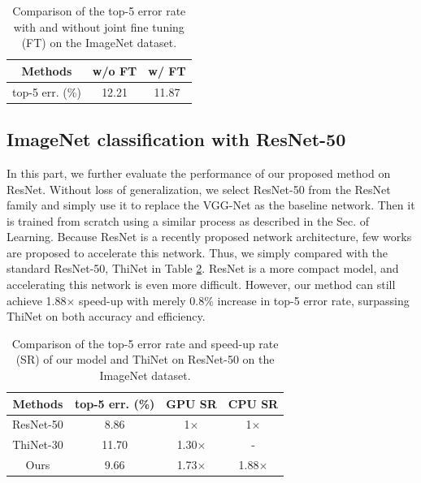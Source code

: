 \documentclass[letterpaper]{article} %
\begin{document}
\begin{table}[htbp]
\centering
\begin{tabular}{c|c|c}
\hline
\centering  Methods  & w/o FT & w/ FT\\
\hline
\hline
top-5 err. (\%) & 12.21 & 11.87 \\
\hline
\end{tabular}
\caption{Comparison of the top-5 error rate with and without joint fine tuning (FT) on the ImageNet dataset.}
\label{table:ft}
\end{table}

\subsection{ImageNet classification with ResNet-50}
In this part, we further evaluate the performance of our proposed method on ResNet. Without loss of generalization, we select ResNet-50 from the ResNet family and simply use it to replace the VGG-Net as the baseline network. Then it is trained from scratch using a similar process as described in the Sec. of Learning. Because ResNet is a recently proposed network architecture, few works are proposed to accelerate this network. Thus, we simply compared with the standard ResNet-50, ThiNet in Table \ref{result:reset}. ResNet is a more compact model, and accelerating this network is even more difficult. However, our method can still achieve 1.88$\times$ speed-up with merely 0.8\% increase in top-5 error rate, surpassing ThiNet on both accuracy and efficiency.

\begin{table}[htbp]
\centering
\begin{tabular}{c|c|c|c}
\hline
\centering  Methods  & top-5 err. (\%) & GPU SR & CPU SR\\
\hline
\hline
ResNet-50   & 8.86 & 1$\times$  & 1$\times$ \\
ThiNet-30    & 11.70 & 1.30$\times$  & -    \\
Ours & 9.66 & 1.73$\times$ & 1.88$\times$ \\
\hline
\end{tabular}
\caption{Comparison of the top-5 error rate and speed-up rate (SR) of our model and ThiNet on ResNet-50 on the ImageNet dataset.}
\label{result:reset}
\end{table}
\end{document}
